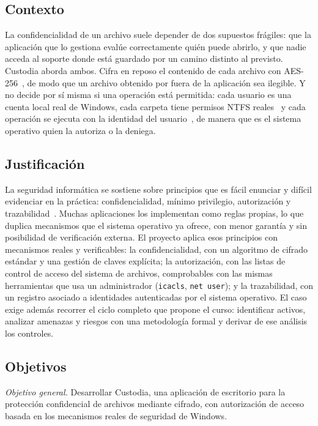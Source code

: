 \documentclass[conference]{IEEEtran}
\begin{document}
\subsection{Contexto}
La confidencialidad de un archivo suele depender de dos supuestos frágiles: que la aplicación que lo gestiona evalúe correctamente quién puede abrirlo, y que nadie acceda al soporte donde está guardado por un camino distinto al previsto. Custodia aborda ambos. Cifra en reposo el contenido de cada archivo con AES-256~\cite{fips197}, de modo que un archivo obtenido por fuera de la aplicación sea ilegible. Y no decide por sí misma si una operación está permitida: cada usuario es una cuenta local real de Windows, cada carpeta tiene permisos NTFS reales~\cite{msacl} y cada operación se ejecuta con la identidad del usuario~\cite{msimp}, de manera que es el sistema operativo quien la autoriza o la deniega.

\subsection{Justificación}
\label{sec:justificacion}
La seguridad informática se sostiene sobre principios que es fácil enunciar y difícil evidenciar en la práctica: confidencialidad, mínimo privilegio, autorización y trazabilidad~\cite{saltzer}. Muchas aplicaciones los implementan como reglas propias, lo que duplica mecanismos que el sistema operativo ya ofrece, con menor garantía y sin posibilidad de verificación externa. El proyecto aplica esos principios con mecanismos reales y verificables: la confidencialidad, con un algoritmo de cifrado estándar y una gestión de claves explícita; la autorización, con las listas de control de acceso del sistema de archivos, comprobables con las mismas herramientas que usa un administrador (\texttt{icacls}, \texttt{net user}); y la trazabilidad, con un registro asociado a identidades autenticadas por el sistema operativo. El caso exige además recorrer el ciclo completo que propone el curso: identificar activos, analizar amenazas y riesgos con una metodología formal y derivar de ese análisis los controles.

\subsection{Objetivos}
\textit{Objetivo general.} Desarrollar Custodia, una aplicación de escritorio para la protección confidencial de archivos mediante cifrado, con autorización de acceso basada en los mecanismos reales de seguridad de Windows.
\end{document}
